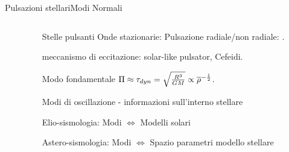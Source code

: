 \begin{frame}{Pulsazioni stellari}{Modi Normali}
\begin{columns}

\begin{column}{0.5\textwidth}  %
    \begin{center}
     \end{center}
\end{column}

\begin{column}{0.5\textwidth}
 \begin{block}{Stelle pulsanti}
Onde stazionarie: Pulsazione radiale/non radiale: .

 meccanismo di eccitazione: solar-like pulsator, Cefeidi.

 Modo fondamentale $\Pi\approx\tau_{dyn}=\sqrt{\frac{R^3}{GM}}\propto\overline{\rho}^{-\frac{1}{2}}$.

 Modi di oscillazione - informazioni sull'interno stellare

 Elio-sismologia: Modi $\Leftrightarrow$ Modelli solari

 Astero-sismologia: Modi $\Leftrightarrow$ Spazio parametri modello stellare


\end{block}

\end{column}

\end{columns}
\end{frame}
